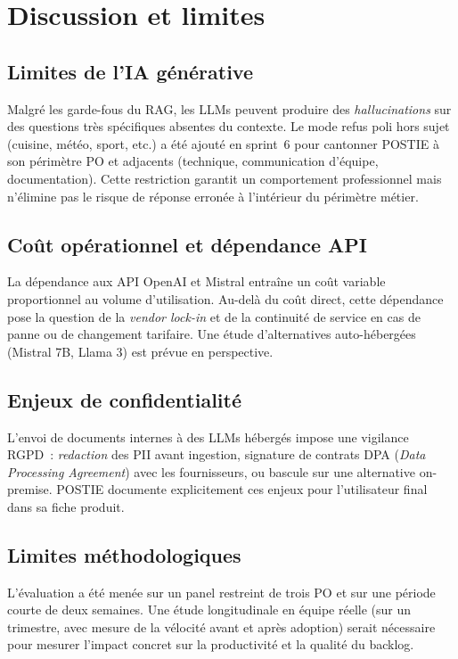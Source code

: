 \chapter{Discussion et limites}
\label{ch:disc}

\section{Limites de l'IA générative}
Malgré les garde-fous du RAG, les LLMs peuvent produire des
\emph{hallucinations} sur des questions très spécifiques absentes
du contexte. Le mode \og refus poli \fg{} hors sujet (cuisine,
météo, sport, etc.) a été ajouté en sprint~6 pour cantonner POSTIE
à son périmètre PO et adjacents (technique, communication d'équipe,
documentation). Cette restriction garantit un comportement
professionnel mais n'élimine pas le risque de réponse erronée à
l'intérieur du périmètre métier.

\section{Coût opérationnel et dépendance API}
La dépendance aux API OpenAI et Mistral entraîne un coût variable
proportionnel au volume d'utilisation. Au-delà du coût direct, cette
dépendance pose la question de la \emph{vendor lock-in} et de la
continuité de service en cas de panne ou de changement tarifaire.
Une étude d'alternatives auto-hébergées (Mistral 7B, Llama 3) est
prévue en perspective.

\section{Enjeux de confidentialité}
L'envoi de documents internes à des LLMs hébergés impose une
vigilance RGPD~: \textit{redaction} des PII avant ingestion,
signature de contrats DPA (\textit{Data Processing Agreement}) avec
les fournisseurs, ou bascule sur une alternative on-premise. POSTIE
documente explicitement ces enjeux pour l'utilisateur final dans
sa fiche produit.

\section{Limites méthodologiques}
L'évaluation a été menée sur un panel restreint de trois PO et sur
une période courte de deux semaines. Une étude longitudinale en
équipe réelle (sur un trimestre, avec mesure de la vélocité avant
et après adoption) serait nécessaire pour mesurer l'impact concret
sur la productivité et la qualité du backlog.

